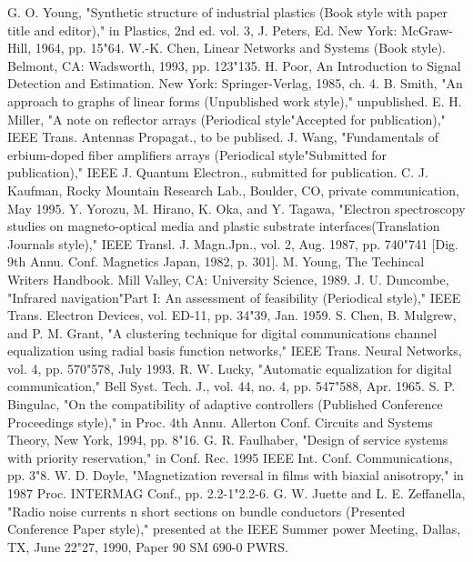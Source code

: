 \documentclass[letterpaper, 10 pt, conference]{ieeeconf}  %
\begin{document}
\begin{thebibliography}{99}

 G. O. Young, "Synthetic structure of industrial plastics (Book style with paper title and editor)," 	in Plastics, 2nd ed. vol. 3, J. Peters, Ed.  New York: McGraw-Hill, 1964, pp. 15"64.
 W.-K. Chen, Linear Networks and Systems (Book style).	Belmont, CA: Wadsworth, 1993, pp. 123"135.
 H. Poor, An Introduction to Signal Detection and Estimation.   New York: Springer-Verlag, 1985, ch. 4.
 B. Smith, "An approach to graphs of linear forms (Unpublished work style)," unpublished.
 E. H. Miller, "A note on reflector arrays (Periodical style"Accepted for publication)," IEEE Trans. Antennas Propagat., to be publised.
 J. Wang, "Fundamentals of erbium-doped fiber amplifiers arrays (Periodical style"Submitted for publication)," IEEE J. Quantum Electron., submitted for publication.
 C. J. Kaufman, Rocky Mountain Research Lab., Boulder, CO, private communication, May 1995.
 Y. Yorozu, M. Hirano, K. Oka, and Y. Tagawa, "Electron spectroscopy studies on magneto-optical media and plastic substrate interfaces(Translation Journals style)," IEEE Transl. J. Magn.Jpn., vol. 2, Aug. 1987, pp. 740"741 [Dig. 9th Annu. Conf. Magnetics Japan, 1982, p. 301].
 M. Young, The Techincal Writers Handbook.  Mill Valley, CA: University Science, 1989.
 J. U. Duncombe, "Infrared navigation"Part I: An assessment of feasibility (Periodical style)," IEEE Trans. Electron Devices, vol. ED-11, pp. 34"39, Jan. 1959.
 S. Chen, B. Mulgrew, and P. M. Grant, "A clustering technique for digital communications channel equalization using radial basis function networks," IEEE Trans. Neural Networks, vol. 4, pp. 570"578, July 1993.
 R. W. Lucky, "Automatic equalization for digital communication," Bell Syst. Tech. J., vol. 44, no. 4, pp. 547"588, Apr. 1965.
 S. P. Bingulac, "On the compatibility of adaptive controllers (Published Conference Proceedings style)," in Proc. 4th Annu. Allerton Conf. Circuits and Systems Theory, New York, 1994, pp. 8"16.
 G. R. Faulhaber, "Design of service systems with priority reservation," in Conf. Rec. 1995 IEEE Int. Conf. Communications, pp. 3"8.
 W. D. Doyle, "Magnetization reversal in films with biaxial anisotropy," in 1987 Proc. INTERMAG Conf., pp. 2.2-1"2.2-6.
 G. W. Juette and L. E. Zeffanella, "Radio noise currents n short sections on bundle conductors (Presented Conference Paper style)," presented at the IEEE Summer power Meeting, Dallas, TX, June 22"27, 1990, Paper 90 SM 690-0 PWRS.

\end{thebibliography}
\end{document}
